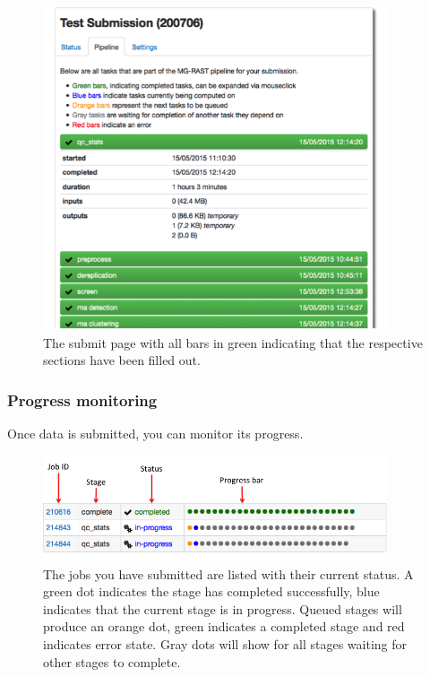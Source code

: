 \documentclass[12pt,fullpage]{report}
\begin{document}
\begin{figure}
\begin{center} 
\includegraphics[width=4in]{Images/submission_done.png} 
\end{center} \label{fig:submission_done} 
\caption{The submit page with all bars in green indicating that the respective sections have been filled out.}
\end{figure}

\subsubsection{Progress monitoring}
Once data is submitted, you can monitor its progress.

\begin{figure}
\begin{center} 
\includegraphics[width=4in]{Images/submission_pipeline_view.png} 
\end{center} \label{fig:submission_pipeline_view} 
\caption{The jobs you have submitted are listed with their current status. A green dot indicates the stage has completed successfully, blue indicates that the current stage is in progress. Queued stages will produce an orange dot, green indicates a completed stage and red indicates error state. Gray dots will show for all stages waiting for other stages to complete.}
\end{figure}
\end{document}
